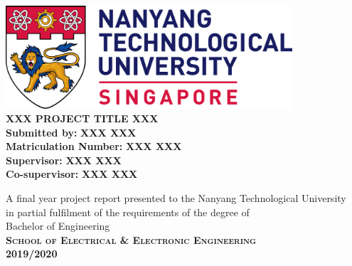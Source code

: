 \begin{titlepage}
\begin{center}

\includegraphics[width=0.8\textwidth]{./figures/ntu_logo.png}
\\[3cm]

\uppercase{\huge{\textbf{xxx project title xxx}}}
\\[3cm]

\textbf{\large Submitted by:}
\large{\textbf{XXX XXX}}
\\
\textbf{\large Matriculation Number:}
\large{\textbf{XXX XXX}}
\\[1cm]
\textbf{\large Supervisor:}
\large{\textbf{XXX XXX}}
\\
\textbf{\large Co-supervisor:}
\large{\textbf{XXX XXX}}

\vfill


\normalsize A final year project report presented to the Nanyang Technological University\\
in partial fulfilment of the requirements of the degree of\\
Bachelor of Engineering
\\[0.8cm]

\textsc{\bfseries School of Electrical \& Electronic Engineering}
\\
\textbf{2019/2020}

\end{center}
\end{titlepage}
